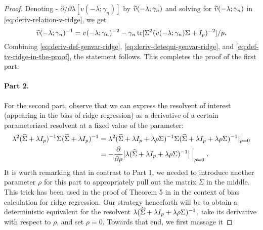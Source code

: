 \documentclass{article}
\begin{document}
\begin{proof}
    Denoting 
    - $\partial / \partial \lambda [v(-\lambda; \gamma_n)]$
    by $\widetilde{v}(-\lambda; \gamma_n)$
    and solving for $\widetilde{v}(-\lambda; \gamma_n)$
    in \eqref{eq:deriv-relation-v-ridge},
    we get
    \begin{equation}
        \label{eq:def-tv-ridge-in-the-proof}
        \widetilde{v}(-\lambda; \gamma_n)^{-1}
        = 
        v(-\lambda; \gamma_n)^{-2}
        - \gamma_n \operatorname{tr}[\Sigma^2 (v(-\lambda; \gamma_n) \Sigma + I_p)^{-2}] / p.
    \end{equation}
    Combining 
    \eqref{eq:deriv-def-genvar-ridge},
    \eqref{eq:deriv-detequi-genvar-ridge},
    and 
    \eqref{eq:def-tv-ridge-in-the-proof},
    the statement follows.
    This completes the proof of the first part.
    
    
    \paragraph{Part 2.}
    For the second part,
    observe that we can express
    the resolvent of interest 
    (appearing in the bias of ridge regression)
    as a derivative 
    of a certain parameterized resolvent at a fixed value
    of the parameter:
    \begin{equation}
        \label{eq:deriv-def-genbias-ridge}
        \begin{split}
        \lambda^2 
        ({\widehat{\Sigma}} + \lambda I_p)^{-1}
        \Sigma
        ({\widehat{\Sigma}} + \lambda I_p)^{-1}
        &=
        \lambda^2
        ({\widehat{\Sigma}} + \lambda I_p + \lambda \rho \Sigma)^{-1} 
        \Sigma 
        ({\widehat{\Sigma}} + \lambda I_p + \lambda \rho \Sigma)^{-1} |_{\rho = 0} \\
        &=
        -
        \frac{\partial}{\partial \rho}
        [\lambda ({\widehat{\Sigma}} + \lambda I_p + \lambda \rho \Sigma)^{-1}] \mathrel{\Big |}_{\rho = 0}.
        \end{split}
    \end{equation}
    It is worth remarking that in contrast to Part 1, we needed
    to introduce another parameter $\rho$ for this part to appropriately
    pull out the matrix $\Sigma$ in the middle.
    This trick has been used in the proof
    of Theorem 5 in \cite{hastie2022surprises}
    in the context of bias calculation for ridge regression.
    Our strategy henceforth will be to
    obtain a deterministic equivalent
    for the resolvent $\lambda ({\widehat{\Sigma}} + \lambda I_p + \lambda \rho \Sigma)^{-1}$,
    take its derivative with respect to $\rho$, and set $\rho = 0$.
    Towards that end,
    we first massage it

\end{proof}
\end{document}
